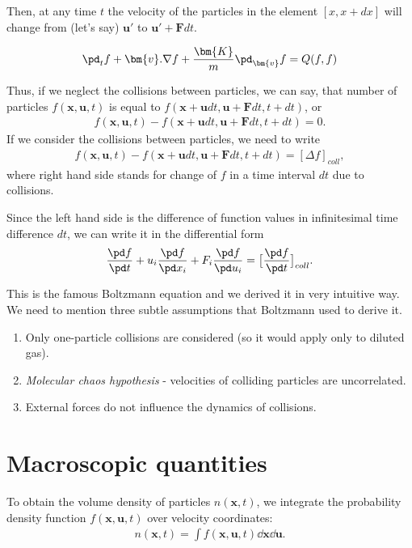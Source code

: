 Then, at any time $t$ the velocity of the particles in the element $[x, x + dx]$ will change from (let's say) $\bm{u'}$ to $\bm{u'} + \bm{F}dt$.

\begin{align*}
\pd_t f + \bm{v}.\nabla f + \frac{\bm{K}}{m}\pd_{\bm{v}} f = Q(f,f)
\end{align*}

Thus, if we neglect the collisions between particles, we can say, that number of particles 
$f(\bm{x}, \bm{u}, t)$ is equal to $f(\bm{x + u}dt, \bm{u + F}dt, t + dt)$, or 
\begin{align*}
f(\bm{x}, \bm{u}, t) - f(\bm{x + u}dt, \bm{u + F}dt, t + dt) = 0.
\end{align*}
If we consider the collisions between particles, we need to write
\begin{align*}
f(\bm{x}, \bm{u}, t) - f(\bm{x + u}dt, \bm{u + F}dt, t + dt) = [\Delta f]_{coll},
\end{align*}
where right hand side stands for change of $f$ in a time interval $dt$ due to collisions.

Since the left hand side is the difference of function values in infinitesimal time difference $dt$, we can write it in the differential form
\begin{align} \label{BoltzmannE}
\frac{\pd f}{\pd t} + u_i \frac{\pd f}{\pd x_i} + F_i \frac{\pd f}{\pd u_i} = \big[\frac{\pd f}{\pd t} \big]_{coll}.
\end{align}

This is the famous Boltzmann equation and we derived it in very intuitive way. We need to mention three subtle assumptions that Boltzmann used to derive it.
\begin{enumerate}
\item Only one-particle collisions are considered (so it would apply only to diluted gas).
\item \textit{Molecular chaos hypothesis} - velocities of colliding particles are uncorrelated.
\item External forces do not influence the dynamics of collisions.
\end{enumerate}

\section{Macroscopic quantities}
To obtain the volume density of particles $n(\bm{x},t)$, we integrate the probability density function $f(\bm{x},\bm{u},t)$ over velocity coordinates:
\begin{align*}
n(\bm{x},t) = \int f(\bm{x,u},t) \dd \bm{x} \dd \bm{u}.
\end{align*}

